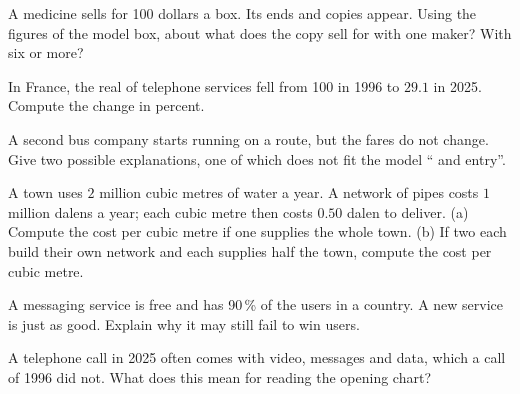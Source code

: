 \begin{exercise}[$\star\star$]\label{exo:g8:competition-and-monopoly-first-look:7}
A medicine sells for 100 dollars a box. Its  ends and copies appear. Using the figures of the
model box, about what  does the copy sell for with one maker? With six or more?
\end{exercise}

\begin{exercise}[$\star\star$]\label{exo:g8:competition-and-monopoly-first-look:8}
In France, the real  of telephone services fell from 100 in 1996 to $29.1$ in 2025. Compute the
change in percent.
\end{exercise}

\begin{exercise}[$\star\star$]\label{exo:g8:competition-and-monopoly-first-look:9}
A second bus company starts running on a route, but the fares do not change. Give two possible
explanations, one of which does not fit the model `` and entry''.
\end{exercise}

\begin{exercise}[$\star\star\star$]\label{exo:g8:competition-and-monopoly-first-look:10}
A town uses $2$ million cubic metres of water a year. A network of pipes costs $1$ million dalens a
year; each cubic metre then costs $0.50$ dalen to deliver. (a) Compute the cost per cubic metre if one
 supplies the whole town. (b) If two  each build their own network and each supplies half
the town, compute the cost per cubic metre.
\end{exercise}

\begin{exercise}[$\star\star\star$]\label{exo:g8:competition-and-monopoly-first-look:11}
A messaging service is free and has 90\,\% of the users in a country. A new service is just as good.
Explain why it may still fail to win users.
\end{exercise}

\begin{exercise}[$\star\star\star$]\label{exo:g8:competition-and-monopoly-first-look:12}
A telephone call in 2025 often comes with video, messages and data, which a call of 1996 did not.
What does this mean for reading the opening chart?
\end{exercise}

